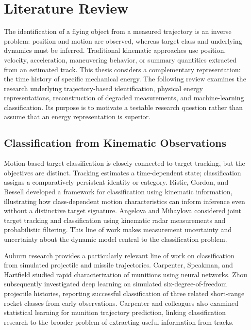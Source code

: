 \chapter{Literature Review}
\label{ch:literature-review}

The identification of a flying object from a measured trajectory is an inverse
problem: position and motion are observed, whereas target class and underlying
dynamics must be inferred. Traditional kinematic approaches use position,
velocity, acceleration, maneuvering behavior, or summary quantities extracted
from an estimated track. This thesis considers a complementary representation:
the time history of specific mechanical energy. The following review examines
the research underlying trajectory-based identification, physical energy
representations, reconstruction of degraded measurements, and machine-learning
classification. Its purpose is to motivate a testable research question rather
than assume that an energy representation is superior.

\section{Classification from Kinematic Observations}
\label{sec:lit-kinematic}

Motion-based target classification is closely connected to target tracking,
but the objectives are distinct. Tracking estimates a time-dependent state;
classification assigns a comparatively persistent identity or category.
Ristic, Gordon, and Bessell \cite{ristic2004kinematic} developed a framework
for classification using kinematic information, illustrating how
class-dependent motion characteristics can inform inference even without
a distinctive target signature. Angelova and Mihaylova
\cite{angelova2006joint} considered joint target tracking and classification
using kinematic radar measurements and probabilistic filtering. This line
of work makes measurement uncertainty and uncertainty about the dynamic
model central to the classification problem.

Auburn research provides a particularly relevant line of work on
classification from simulated projectile and missile trajectories.
Carpenter, Speakman, and Hartfield \cite{carpenter2016rapid}
studied rapid characterization of munitions using neural networks.
Zhou \cite{zhou2018deep} subsequently investigated deep learning
on simulated six-degree-of-freedom projectile histories, reporting
successful classification of three related short-range rocket classes
from early observations. Carpenter and colleagues
\cite{carpenter2019statistical} also examined statistical learning
for munition trajectory prediction, linking classification research
to the broader problem of extracting useful information from tracks.

